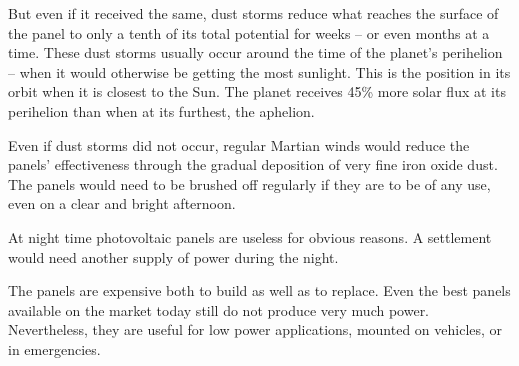 But even if it received the same, dust storms reduce what reaches the surface of the panel to only a tenth of its total potential for weeks -- or even months at a time. These dust storms usually occur around the time of the planet's perihelion -- when it would otherwise be getting the most sunlight. This is the position in its orbit when it is closest to the Sun. The planet receives 45\% more solar flux at its perihelion than when at its furthest, the aphelion. 

Even if dust storms did not occur, regular Martian winds would reduce the panels' effectiveness through the gradual deposition of very fine iron oxide dust. The panels would need to be brushed off regularly if they are to be of any use, even on a clear and bright afternoon.

At night time photovoltaic panels are useless for obvious reasons. A settlement would need another supply of power during the night.

The panels are expensive both to build as well as to replace. Even the best panels available on the market today still do not produce very much power. Nevertheless, they are useful for low power applications, mounted on vehicles, or in emergencies.

